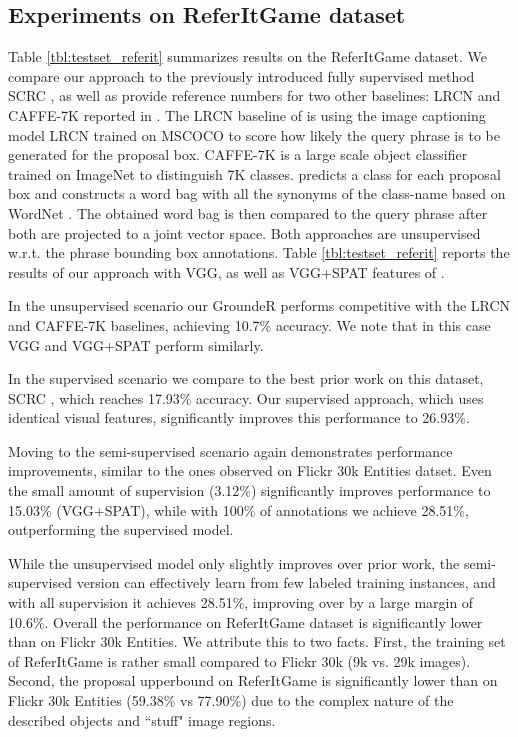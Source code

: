 \subsection{Experiments on ReferItGame dataset}
Table \ref{tbl:testset_referit} summarizes results on the ReferItGame dataset. We compare our approach to the previously introduced fully supervised method SCRC \cite{hu16cvpr}, as well as provide reference numbers for two other baselines: LRCN \cite{donahue15cvpr} and CAFFE-7K \cite{guadarrama2014open} reported in \cite{hu16cvpr}. The LRCN baseline of \cite{hu16cvpr} is using the image captioning model LRCN \cite{donahue15cvpr} trained on MSCOCO \cite{coco2014} to score how likely the query phrase is to be generated for the proposal box. CAFFE-7K is a large scale object classifier trained on ImageNet \cite{deng09cvpr} to distinguish 7K classes. \cite{guadarrama2014open} predicts a class for each proposal box and constructs a word bag with all the synonyms of the class-name based on WordNet \cite{fellbaum:wordnet}. The obtained word bag is then compared to the query phrase after both are projected to a joint vector space. Both approaches are unsupervised w.r.t. the phrase bounding box annotations. Table \ref{tbl:testset_referit} reports the results of our approach with VGG, as well as VGG+SPAT features of \cite{hu16cvpr}.

In the unsupervised scenario our GroundeR performs competitive with the LRCN and CAFFE-7K baselines, achieving 10.7\% accuracy. We note that in this case VGG and VGG+SPAT perform similarly.

In the supervised scenario we compare to the best prior work on this dataset, SCRC \cite{hu16cvpr}, which reaches 17.93\% accuracy. Our supervised approach, which uses identical visual features, significantly improves this performance to 26.93\%. 

Moving to the semi-supervised scenario again demonstrates performance improvements, similar to the ones observed on Flickr 30k Entities datset. Even the small amount of supervision (3.12\%) significantly improves performance to 15.03\% (VGG+SPAT), while with 100\% of annotations we achieve 28.51\%, outperforming the supervised model.  

While the unsupervised model only slightly improves over prior work, the semi-supervised version can effectively learn from few labeled training instances, and with all supervision it achieves 28.51\%, improving over \cite{hu16cvpr} by a large margin of 10.6\%. Overall the performance on ReferItGame dataset is significantly lower than on Flickr 30k Entities. We attribute this to two facts. First, the training set of ReferItGame is rather small compared to Flickr 30k (9k vs. 29k images). Second, the proposal upperbound on ReferItGame is significantly lower than on Flickr 30k Entities (59.38\% vs 77.90\%) due to the complex nature of the described objects and ``stuff" image regions.

